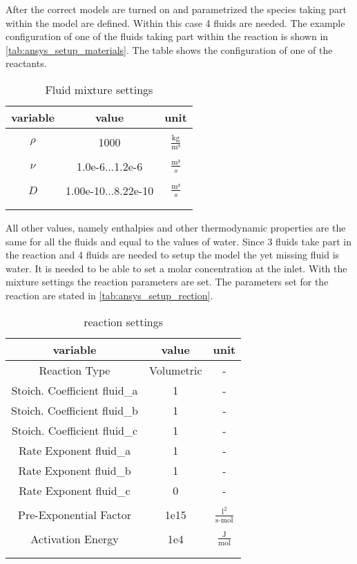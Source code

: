 \documentclass[../thesis.tex]{subfiles}
\begin{document}
After the correct models are turned on and parametrized the species taking part within the model are defined. Within this case 4 fluids are needed. The example configuration of one of the fluids taking part within the reaction is shown in \autoref{tab:ansys_setup_materials}. The table shows the configuration of one of the reactants.
\begin{table} [htb]
	\centering
	\caption{Fluid mixture settings}
	\begin{tabular}{ ccc }
		\hline
		variable & value & unit \\
		\hline
		\\[-1em]
		$\rho$ & 1000 & $\frac{\text{kg}}{\text{m³}}$ \\
		\\[-1em]
		$\nu$ & 1.0e-6...1.2e-6 & $\frac{\text{m²}}{s}$ \\
		\\[-1em]
		$D$ & 1.00e-10...8.22e-10 & $\frac{\text{m²}}{s}$\\
		\\[-1em]
		\hline
		\label{tab:ansys_setup_materials}
	\end{tabular}
\end{table}
All other values, namely enthalpies and other thermodynamic properties are the same for all the fluids and equal to the values of water. Since 3 fluids take part in the reaction and 4 fluids are needed to setup the model the yet missing fluid is water. It is needed to be able to set a molar concentration at the inlet. With the mixture settings the reaction parameters are set. The parameters set for the reaction are stated in \autoref{tab:ansys_setup_rection}.
\begin{table} [htb]
	\centering
	\caption{reaction settings}
	\begin{tabular}{ ccc }
		\hline
		variable & value & unit \\
		\hline
		Reaction Type & Volumetric & - \\
		Stoich. Coefficient fluid\_a & 1 & - \\
		Stoich. Coefficient fluid\_b & 1 & - \\
		Stoich. Coefficient fluid\_c & 1 & - \\
		Rate Exponent fluid\_a & 1 & - \\
		Rate Exponent fluid\_b & 1 & - \\
		Rate Exponent fluid\_c & 0 & - \\
		\\[-1em]
		Pre-Exponential Factor & 1e15 & $\frac{\text{l}^2}{\text{s} \cdot \text{mol}}$ \\
		\\[-1em]
		Activation Energy & 1e4 & $\frac{\text{J}}{\text{mol}}$ \\
		\\[-1em]
		\hline
		\label{tab:ansys_setup_rection}
	\end{tabular}
\end{table}
\end{document}
